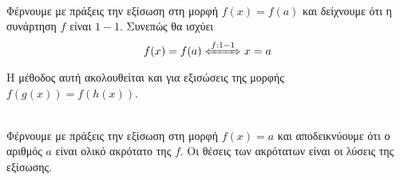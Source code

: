 \documentclass[ektypwsh]{frontisthrio}
\begin{document}
\begin{periptwsh}
\item {}\\
Φέρνουμε με πράξεις την εξίσωση στη μορφή $ f(x)=f(a) $ και δείχνουμε ότι η συνάρτηση $ f $ είναι $ 1-1 $. Συνεπώς θα ισχύει
\[ f(x)=f(a)\xLeftrightarrow{f:1-1} x=a \]
Η μέθοδος αυτή ακολουθείται και για εξισώσεις της μορφής $ f(g(x))=f(h(x)) $.
\item {}\\
Φέρνουμε με πράξεις την εξίσωση στη μορφή $ f(x)=a $ και αποδεικνύουμε ότι ο αριθμός $ a $ είναι ολικό ακρότατο της $ f $. Οι θέσεις των ακρότατων είναι οι λύσεις της εξίσωσης.
\end{periptwsh}
\end{document}
